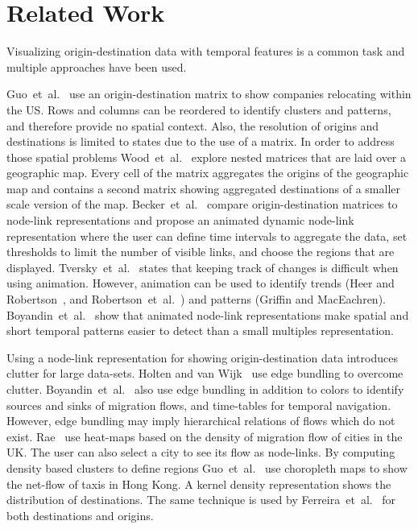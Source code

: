 \documentclass[a4paper,twocolumn]{article}
\author{Josua Krause}
\begin{document}
\section*{Related Work}
Visualizing origin-destination data with temporal features
is a common task and multiple approaches have been used.

Guo~et~al.~\cite{Guo2006} use an origin-destination matrix
to show companies relocating within the US.
Rows and columns can be reordered to identify clusters
and patterns, and therefore provide no spatial context.
Also, the resolution of origins and destinations is limited
to states due to the use of a matrix.
In order to address those spatial problems
Wood~et~al.~\cite{Wood2002} explore nested matrices
that are laid over a geographic map.
Every cell of the matrix aggregates the origins
of the geographic map and contains
a second matrix showing aggregated destinations of
a smaller scale version of the map.
Becker~et~al.~\cite{Becker1995} compare
origin-destination matrices to node-link representations
and propose an animated dynamic node-link representation
where the user can define time intervals to aggregate the data,
set thresholds to limit the number of visible links,
and choose the regions that are displayed.
Tversky~et~al.~\cite{Tversky2002} states that
keeping track of changes is difficult when using
animation. However, animation can be used to
identify trends (Heer and Robertson~\cite{Heer2007},
and Robertson~et~al.~\cite{Robertson}) and
patterns (Griffin and MacEachren\cite{Griffin2006}).
Boyandin~et~al.~\cite{Boyandin2012} show that animated
node-link representations make spatial and short temporal
patterns easier to detect than a small multiples representation.

Using a node-link representation for showing origin-destination
data introduces clutter for large data-sets.
Holten and van Wijk~\cite{Holten2009} use edge bundling to overcome clutter.
Boyandin~et~al.~\cite{Boyandin2008} also use edge bundling
in addition to colors to identify sources and sinks of migration
flows, and time-tables for temporal navigation.
However, edge bundling may imply hierarchical
relations of flows which do not exist.
Rae~\cite{Rae2009} use heat-maps based on
the density of migration flow of cities in the UK.
The user can also select a city to see its flow as node-links.
By computing density based clusters to define regions
Guo~et~al.~\cite{Guo2012} use choropleth maps to show
the net-flow of taxis in Hong Kong.
A kernel density representation shows the distribution
of destinations.
The same technique is used by Ferreira~et~al.~\cite{Ferreira2013}
for both destinations and origins.
\end{document}

